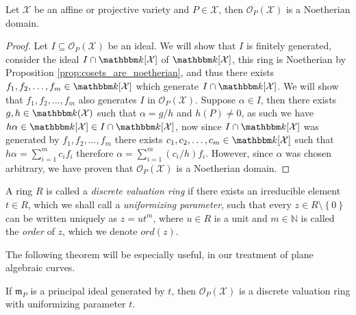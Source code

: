 \begin{lemma}\label{lem:local_ring_is_noetherian_domain}
  Let $\mathcal{X}$ be an affine or projective variety and $P \in \mathcal{X}$, then $\mathcal{O}_{P}(\mathcal{X})$ is a Noetherian domain.
\end{lemma}
\newpage
\begin{proof}
  Let $I \subseteq \mathcal{O}_P(\mathcal{X})$ be an ideal. We will show that $I$ is finitely generated, consider the ideal $I \cap \K[\mathcal{X}]$ of $\K[\mathcal{X}]$, this ring is Noetherian by Proposition \ref{prop:cosets_are_noetherian}, and thus there exists $f_1, f_2, \ldots, f_{m} \in \K[\mathcal{X}]$ which generate $I \cap \K[\mathcal{X}]$. We will show that $f_1, f_2, \ldots, f_{m}$ also generates $I$ in $\mathcal{O}_{P}(\mathcal{X})$. Suppose $\alpha \in I$, then there exists $g, h \in \K(\mathcal{X})$ such that $\alpha = g / h$ and $h(P) \neq 0$, as such we have $h \alpha \in \K[\mathcal{X}] \in I \cap \K[\mathcal{X}]$, now since $I \cap \K[\mathcal{X}]$ was generated by $f_1, f_2, \ldots, f_{m}$ there exists $c_1, c_2, \ldots, c_{m} \in \K[\mathcal{X}]$ such that $h \alpha = \sum_{i = 1}^{m} c_{i} f_{i}$ therefore $\alpha = \sum_{i = 1}^m (c_i / h) f_{i}$. However, since $\alpha$ was chosen arbitrary, we have proven that $\mathcal{O}_{P}(\mathcal{X})$ is a Noetherian domain.
\end{proof}

\begin{definition} \label{def:dvr}
A ring $R$ is called a \textit{discrete valuation ring} if there exists an irreducible element $t \in R$, which we shall call a \textit{uniformizing parameter}, such that every $z \in R \setminus \left\{0\right\}$ can be written uniquely as $z = ut^{m}$, where $u \in R$ is a unit and $m \in \mathbb{N}$ is called the \textit{order} of $z$, which we denote $ord(z)$.
\end{definition}

The following theorem will be especially useful, in our treatment of plane algebraic curves.
\begin{theorem}\label{thm:local_ring_is_a_DVR}
  If $\mathfrak{m}_{P}$ is a principal ideal generated by $t$, then $\mathcal{O}_{P}(\mathcal{X})$ is a discrete valuation ring with uniformizing parameter $t$.
\end{theorem}

